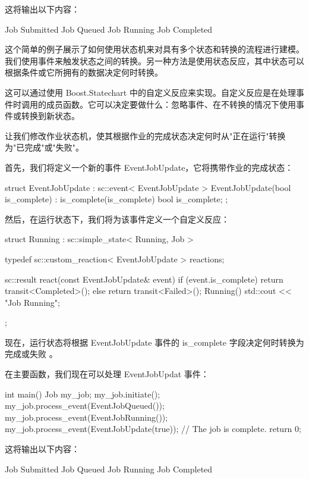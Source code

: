 这将输出以下内容：

\begin{shell}
Job Submitted
Job Queued
Job Running
Job Completed
\end{shell}

这个简单的例子展示了如何使用状态机来对具有多个状态和转换的流程进行建模。我们使用事件来触发状态之间的转换。另一种方法是使用状态反应，其中状态可以根据条件或它所拥有的数据决定何时转换。

这可以通过使用 Boost.Statechart 中的自定义反应来实现。自定义反应是在处理事件时调用的成员函数。它可以决定要做什么：忽略事件、在不转换的情况下使用事件或转换到新状态。

让我们修改作业状态机，使其根据作业的完成状态决定何时从"正在运行"转换为"已完成"或"失败"。

首先，我们将定义一个新的事件 EventJobUpdate，它将携带作业的完成状态：

\begin{cpp}
struct EventJobUpdate : sc::event< EventJobUpdate > {
    EventJobUpdate(bool is_complete) : is_complete(is_complete) {}
    bool is_complete;
};
\end{cpp}

然后，在运行状态下，我们将为该事件定义一个自定义反应：

\begin{cpp}
struct Running : sc::simple_state< Running, Job > {
    typedef sc::custom_reaction< EventJobUpdate > reactions;

    sc::result react(const EventJobUpdate& event) {
        if (event.is_complete) {
            return transit<Completed>();
        } else {
            return transit<Failed>();
        }
    }
    Running() { std::cout << "Job Running\n"; }
};
\end{cpp}

现在，运行状态将根据 EventJobUpdate 事件的 is\_complete 字段决定何时转换为完成或失败
。

在主要函数，我们现在可以处理 EventJobUpdat 事件：

\begin{cpp}
int main() {
    Job my_job;
    my_job.initiate();
    my_job.process_event(EventJobQueued());
    my_job.process_event(EventJobRunning());
    my_job.process_event(EventJobUpdate(true)); // The job is complete.
    return 0;
}
\end{cpp}

这将输出以下内容：

\begin{shell}
Job Submitted
Job Queued
Job Running
Job Completed
\end{shell}

